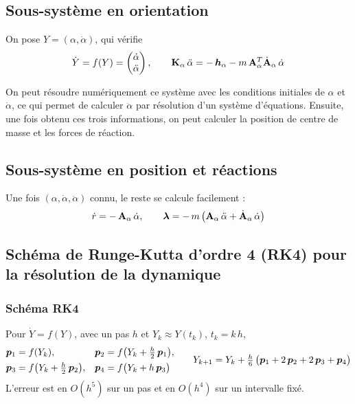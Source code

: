 \subsection{Sous-système en orientation}

\begin{proposition}
    On pose $Y = (\alpha,\dot\alpha)$, qui vérifie
\[
    \dot Y = f(Y) = \begin{pmatrix} \dot\alpha\\ \ddot\alpha \end{pmatrix},
    \qquad
    \mathbf{K}_\alpha\,\ddot\alpha = -\,\bm{h}_\alpha
    - m\,\mathbf{A}_\alpha^T\dot{\mathbf{A}}_\alpha\,\dot\alpha
\]
\end{proposition}
On peut résoudre numériquement ce système avec les conditions initiales de $\alpha$ et $\dot{\alpha}$, ce qui permet de calculer $\ddot{\alpha}$ par résolution d'un système d'équations. Ensuite, une fois obtenu ces trois informations, on peut calculer la position de centre de masse et les forces de réaction.

\subsection{Sous-système en position et réactions}

\begin{proposition}
    Une fois $(\alpha,\dot\alpha,\ddot\alpha)$ connu, le reste se calcule facilement : 
\[
    \dot r = -\,\mathbf{A}_\alpha\,\dot\alpha,
    \qquad
    \bm{\lambda} = -\,m\,\bigl(\mathbf{A}_\alpha\,\ddot\alpha
    + \dot{\mathbf{A}}_\alpha\,\dot\alpha\bigr)
\]
\end{proposition}


\subsection{Schéma de Runge-Kutta d'ordre 4 (RK4) pour la résolution de la dynamique}

\subsubsection{Schéma RK4}

Pour $\dot Y = f(Y)$, avec un pas $h$ et $Y_k \approx Y(t_k)$,
$t_k = k\,h$,
\[
    \begin{aligned}
        \bm{p}_1 &= f(Y_k), &
        \bm{p}_2 &= f\bigl(Y_k + \tfrac{h}{2}\,\bm{p}_1\bigr),\\
        \bm{p}_3 &= f\bigl(Y_k + \tfrac{h}{2}\,\bm{p}_2\bigr), &
        \bm{p}_4 &= f\bigl(Y_k + h\,\bm{p}_3\bigr)
    \end{aligned}
    \qquad
    Y_{k+1} = Y_k + \tfrac{h}{6}\,\bigl(\bm{p}_1 + 2\,\bm{p}_2
    + 2\,\bm{p}_3 + \bm{p}_4\bigr)
\]
L'erreur est en $O(h^5)$ sur un pas et en $O(h^4)$ sur un intervalle
fixé.

